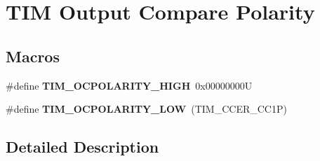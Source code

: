 \hypertarget{group___t_i_m___output___compare___polarity}{}\section{T\+IM Output Compare Polarity}
\label{group___t_i_m___output___compare___polarity}
\subsection*{Macros}
\begin{DoxyCompactItemize}
\item 
\mbox{\label{group___t_i_m___output___compare___polarity_ga5887380660b742f0045e9695914231b8}} 
\#define {\bfseries T\+I\+M\+\_\+\+O\+C\+P\+O\+L\+A\+R\+I\+T\+Y\+\_\+\+H\+I\+GH}~0x00000000U
\item 
\mbox{\label{group___t_i_m___output___compare___polarity_ga1daff1574b0a2d17ccc9ae40a649ac37}} 
\#define {\bfseries T\+I\+M\+\_\+\+O\+C\+P\+O\+L\+A\+R\+I\+T\+Y\+\_\+\+L\+OW}~(T\+I\+M\+\_\+\+C\+C\+E\+R\+\_\+\+C\+C1P)
\end{DoxyCompactItemize}


\subsection{Detailed Description}
